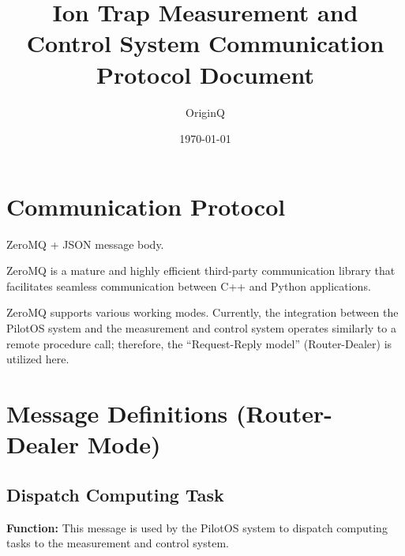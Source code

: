 \documentclass[12pt, a4paper]{article}
\title{\textbf{Ion Trap Measurement and Control System Communication Protocol Document}}
\author{OriginQ}
\date{\today}
\begin{document}
\maketitle
\tableofcontents
\newpage

\section{Communication Protocol}

ZeroMQ + JSON message body.

ZeroMQ is a mature and highly efficient third-party communication library that facilitates seamless communication between C++ and Python applications.

ZeroMQ supports various working modes. Currently, the integration between the PilotOS system and the measurement and control system operates similarly to a remote procedure call; therefore, the ``Request-Reply model'' (Router-Dealer) is utilized here.

\section{Message Definitions (Router-Dealer Mode)}

\subsection{Dispatch Computing Task}

\textbf{Function:} This message is used by the PilotOS system to dispatch computing tasks to the measurement and control system.
\end{document}
